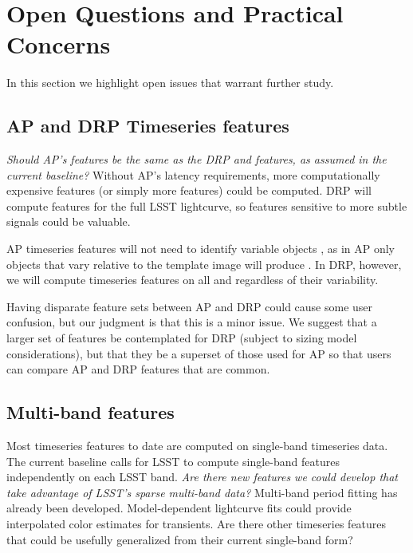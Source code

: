 \documentclass[DM,authoryear,toc]{lsstdoc}
\begin{document}



\section{Open Questions and Practical Concerns}

In this section we highlight open issues that warrant further study.

\subsection{AP and DRP Timeseries features}

\textit{Should AP's \DIAObject features be the same as the DRP \DIAObject and \Object features, as assumed in the current baseline?}
Without AP's latency requirements, more computationally expensive features (or simply more features) could be computed.
DRP will compute features for the full LSST lightcurve, so features sensitive to more subtle signals could be valuable.

AP timeseries features will not need to identify variable objects \citep[e.g.,][]{Pashchenko:18:OGLEClassification}, as in AP only objects that vary relative to the template image will produce \DIASources.
In DRP, however, we will compute timeseries features on all \DIAObjects and \Objects regardless of their variability.

Having disparate feature sets between AP and DRP could cause some user confusion, but our judgment is that this is a minor issue.
We suggest that a larger set of features be contemplated for DRP (subject to sizing model considerations), but that they be a superset of those used for AP so that users can compare AP and DRP features that are common.


\subsection{Multi-band features}

Most timeseries features to date are computed on single-band timeseries data.
The current baseline calls for LSST to compute single-band features independently on each LSST band.
\textit{Are there new features we could develop that take advantage of LSST's sparse multi-band data?}
Multi-band period fitting has already been developed.
Model-dependent lightcurve fits could provide interpolated color estimates for transients.
Are there other timeseries features that could be usefully generalized from their current single-band form?
\end{document}
